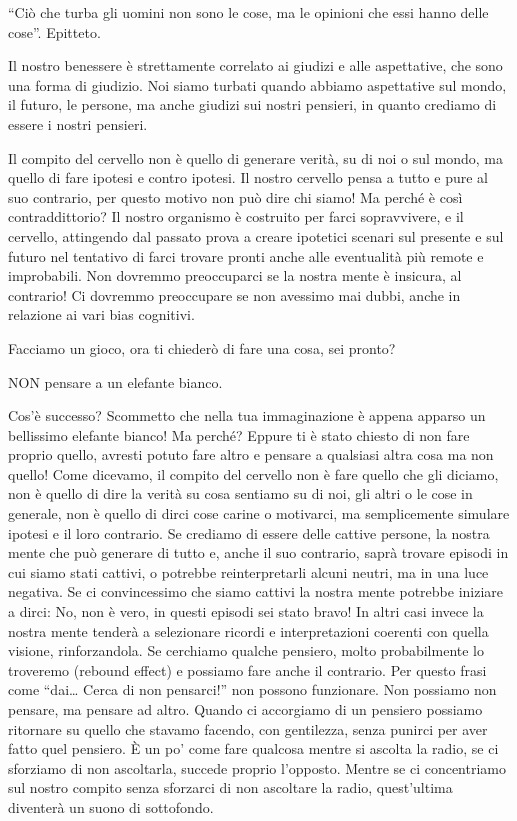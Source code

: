 \documentclass[12pt]{book} %
\begin{document}
“Ciò che turba gli uomini non sono le cose, ma le opinioni che essi hanno delle cose”. Epitteto.

Il nostro benessere è strettamente correlato ai giudizi e alle aspettative, che sono una forma di giudizio. Noi siamo
turbati quando abbiamo aspettative sul mondo, il futuro, le persone, ma anche giudizi sui nostri pensieri, in quanto
crediamo di essere i nostri pensieri.

Il compito del cervello non è quello di generare verità, su di noi o sul mondo, ma quello di fare ipotesi e contro
ipotesi. Il nostro cervello pensa a tutto e pure al suo contrario, per questo motivo non può dire chi siamo! Ma perché
è così contraddittorio? Il nostro organismo è costruito per farci sopravvivere, e il cervello, attingendo dal
passato prova a creare ipotetici scenari sul presente e sul futuro nel tentativo di farci trovare pronti anche alle
eventualità più remote e improbabili. Non dovremmo preoccuparci se la nostra mente è insicura, al contrario! Ci
dovremmo preoccupare se non avessimo mai dubbi, anche in relazione ai vari bias cognitivi. 

Facciamo un gioco, ora ti chiederò di fare una cosa, sei pronto?

NON pensare a un elefante bianco. 

Cos'è successo? Scommetto che nella tua immaginazione è appena apparso un bellissimo elefante
bianco! Ma perché? Eppure ti è stato chiesto di non fare proprio quello, avresti potuto fare altro e pensare a
qualsiasi altra cosa ma non quello! Come dicevamo, il compito del cervello non è fare quello che gli diciamo, non è
quello di dire la verità su cosa sentiamo su di noi, gli altri o le cose in generale, non è quello di dirci cose carine
o motivarci, ma semplicemente simulare ipotesi e il loro contrario. Se crediamo di essere delle cattive persone, la
nostra mente che può generare di tutto e, anche il suo contrario, saprà trovare episodi in cui siamo stati cattivi, o
potrebbe reinterpretarli alcuni neutri, ma in una luce negativa. Se ci convincessimo che siamo cattivi la nostra
mente potrebbe iniziare a dirci: No, non è vero, in questi episodi sei stato bravo! In altri casi invece la nostra mente tenderà a selezionare ricordi e interpretazioni coerenti con quella visione, rinforzandola. Se cerchiamo qualche pensiero,
molto probabilmente lo troveremo (rebound effect) e possiamo fare anche il contrario. Per questo frasi come “dai… Cerca di
non pensarci!” non possono funzionare. Non possiamo non pensare, ma pensare ad altro. Quando ci accorgiamo di un pensiero
possiamo ritornare su quello che stavamo facendo, con gentilezza, senza punirci per aver fatto quel pensiero. È un
po' come fare qualcosa mentre si ascolta la radio, se ci sforziamo di non ascoltarla, succede
proprio l'opposto. Mentre se ci concentriamo sul nostro compito senza sforzarci di non ascoltare
la radio, quest'ultima diventerà un suono di sottofondo.
\end{document}
